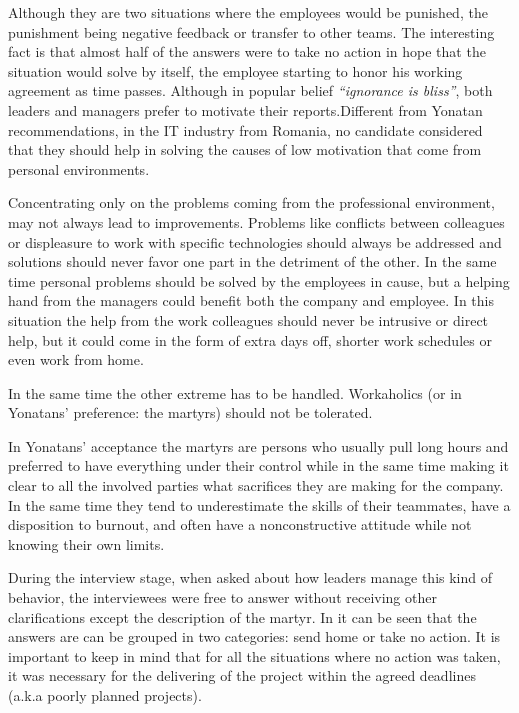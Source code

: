 Although they are two situations where the employees would be punished, the punishment being negative feedback or transfer to other teams.
The interesting fact is that almost half of the answers were to take no action in hope that the situation would solve by itself, the employee starting to honor his working agreement as time passes.
Although in popular belief \textit{``ignorance is bliss''},  both leaders and managers prefer to motivate their reports.Different from Yonatan recommendations, in the IT industry from Romania, no candidate considered that they should help in solving the causes of low motivation that come from personal environments. 

Concentrating only on the problems coming from the professional environment, may not always lead to improvements. Problems like conflicts between colleagues or displeasure to work with specific technologies should always be addressed and solutions should never favor one part in the detriment of the other. In the same time personal problems should be solved by the employees in cause, but a helping hand from the managers could benefit both the company and employee. In this situation the help from the work colleagues should never be intrusive or direct help, but it could come in the form of extra days off, shorter work schedules or even work from home.

In the same time the other extreme has to be handled. Workaholics (or in Yonatans' preference: the martyrs) should not be tolerated. 

In Yonatans' acceptance the martyrs are persons who usually pull long hours and preferred to have everything under their control while in the same time making it clear to all the involved parties what sacrifices they are making for the company. In the same time they tend to underestimate the skills of their teammates, have a disposition to burnout, and often have a nonconstructive attitude while not knowing their own limits. 

During the interview stage, when asked about how leaders manage this kind of behavior, the interviewees were free to answer without receiving other clarifications except the description of the martyr. In  it can be seen that the answers are can be grouped in two categories: send home or take no action. 
It is important to keep in mind that for all the situations where no action was taken, it was necessary for the delivering of the project within the agreed deadlines (a.k.a poorly planned projects).

